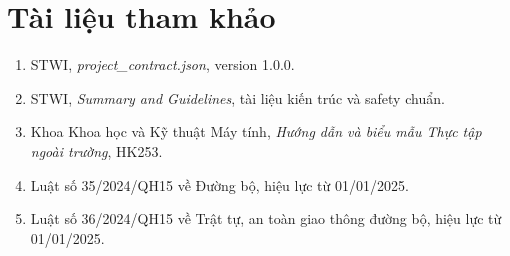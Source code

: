 \documentclass[12pt,a4paper]{report}
\begin{document}
\chapter*{Tài liệu tham khảo}
\begin{enumerate}[leftmargin=1.2cm]
  \item STWI, \textit{project\_contract.json}, version 1.0.0.
  \item STWI, \textit{Summary and Guidelines}, tài liệu kiến trúc và safety chuẩn.
  \item Khoa Khoa học và Kỹ thuật Máy tính, \textit{Hướng dẫn và biểu mẫu Thực tập ngoài trường}, HK253.
  \item Luật số 35/2024/QH15 về Đường bộ, hiệu lực từ 01/01/2025.
  \item Luật số 36/2024/QH15 về Trật tự, an toàn giao thông đường bộ, hiệu lực từ 01/01/2025.
\end{enumerate}
\end{document}

